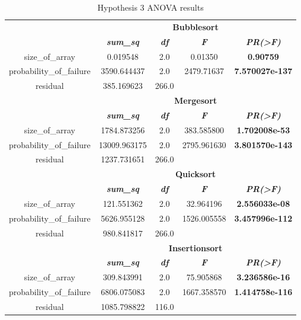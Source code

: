 \begin{table}[H]
    \caption{Hypothesis 3 ANOVA results}
    \begin{center}
    \begin{tabular}{|c|c|c|c|c|}
    \hline
    \multirow{2}{*}{\hfill}&\multicolumn{4}{|c|}{\textbf{Bubblesort}} \\
    \cline{2-5}
    &\textbf{\textit{sum\_sq}} & \textbf{\textit{df}} & \textbf{\textit{F}} & \textbf{\textit{PR(>F)}} \\
    \hline
    size\_of\_array & 0.019548 & 2.0 & 0.01350 & \textbf{0.90759} \\
    \hline
    probability\_of\_failure & 3590.644437 & 2.0 & 2479.71637 & \textbf{7.570027e-137} \\
    \hline
    residual & 385.169623 & 266.0 & &  \\
    \hline
    \multirow{2}{*}{\hfill}&\multicolumn{4}{|c|}{\textbf{Mergesort}} \\
    \cline{2-5}
    &\textbf{\textit{sum\_sq}} & \textbf{\textit{df}} & \textbf{\textit{F}} & \textbf{\textit{PR(>F)}} \\
    \hline
    size\_of\_array & 1784.873256 & 2.0 & 383.585800 & \textbf{1.702008e-53} \\
    \hline
    probability\_of\_failure & 13009.963175 & 2.0 & 2795.961630 & \textbf{3.801570e-143} \\
    \hline
    residual & 1237.731651 & 266.0 & &  \\
    \hline
    \multirow{2}{*}{\hfill}&\multicolumn{4}{|c|}{\textbf{Quicksort}} \\
    \cline{2-5}
    &\textbf{\textit{sum\_sq}} & \textbf{\textit{df}} & \textbf{\textit{F}} & \textbf{\textit{PR(>F)}} \\
    \hline
    size\_of\_array & 121.551362 & 2.0 & 32.964196 & \textbf{2.556033e-08} \\
    \hline
    probability\_of\_failure & 5626.955128 & 2.0 & 1526.005558 & \textbf{3.457996e-112} \\
    \hline
    residual & 980.841817 & 266.0 & &  \\
    \hline
    \multirow{2}{*}{\hfill}&\multicolumn{4}{|c|}{\textbf{Insertionsort}} \\
    \cline{2-5}
    &\textbf{\textit{sum\_sq}} & \textbf{\textit{df}} & \textbf{\textit{F}} & \textbf{\textit{PR(>F)}} \\
    \hline
    size\_of\_array & 309.843991 & 2.0 & 75.905868 & \textbf{3.236586e-16} \\
    \hline
    probability\_of\_failure & 6806.075083 & 2.0 & 1667.358570 & \textbf{1.414758e-116} \\
    \hline
    residual & 1085.798822 & 116.0 & & \\
    \hline
    \end{tabular}
    \label{tab-hypothesis3-testing}
    \end{center}
\end{table}

